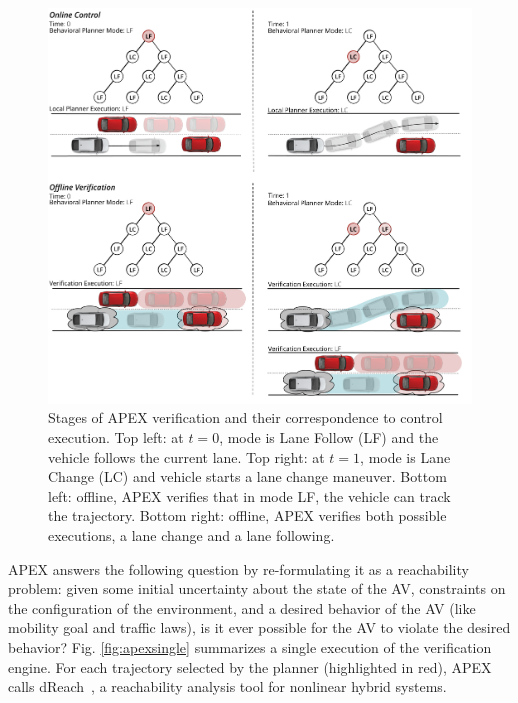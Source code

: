  \begin{figure}
 	\centering
 	\includegraphics[width=\textwidth]{figures/apex_approach.pdf}
 	\caption{ \small Stages of APEX verification and their correspondence to control execution. Top left: at $t=0$, mode is Lane Follow (LF) and the vehicle follows the current lane. Top right: at $t=1$, mode is Lane Change (LC) and vehicle starts a lane change maneuver. Bottom left: offline, APEX verifies that in mode LF, the vehicle can track the trajectory. Bottom right: offline, APEX verifies both possible executions, a lane change and a lane following.}
	\vspace{-10pt}
 	\label{fig:apex_internals}
 \end{figure}
APEX answers the following question by re-formulating it as a reachability problem: given some initial uncertainty about the state of the AV, constraints on the configuration of the environment, and a desired behavior of the AV (like mobility goal and traffic laws), is it ever possible for the AV to violate the desired behavior?
Fig. \ref{fig:apexsingle} summarizes a single execution of the verification engine.
For each trajectory selected by the planner (highlighted in red), APEX calls dReach~\cite{gao2014delta}, a reachability analysis tool for nonlinear hybrid systems.
% 

